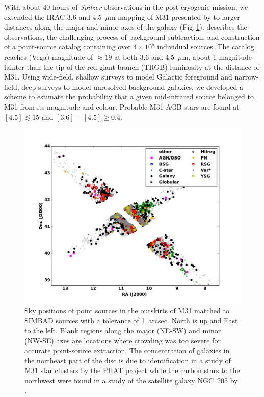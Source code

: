 \documentclass{iau}
\begin{document}
With about 40 hours of {\it Spitzer} observations in the post-cryogenic mission, we extended the IRAC 3.6 and 4.5~$\mu$m
mapping of M31 presented by \cite[Barmby \etal\ (2006)]{barmby06} to larger distances along the major and minor
axes of the galaxy (Fig.\,\ref{fig1}). \cite[Rafiei Ravandi \etal\ (2016)]{rr16} describes the observations, the challenging process of background
subtraction, and construction of a point-source catalog containing over $4\times 10^5$ individual sources. The catalog reaches (Vega)
magnitude of $\approx 19$ at both 3.6 and 4.5~$\mu$m, about 1 magnitude fainter than the tip of the red giant branch (TRGB) luminosity
at the distance of M31. Using wide-field, shallow surveys to model Galactic foreground and narrow-field, deep surveys to model 
unresolved background galaxies, we developed a scheme to estimate the probability that 
a given mid-infrared source belonged to M31 from its magnitude and colour. Probable M31 AGB stars
are found  at $[4.5]\lesssim15$ and $[3.6]-[4.5] \geq 0.4$. 


\begin{figure}[t]
\begin{center}
 \includegraphics[width=5in]{barmby_iaus321_fig1} 
 \caption{Sky positions of point sources in the outskirts of M31 matched to SIMBAD sources with a tolerance of 1~arcsec. North is up and East to the left.
 Blank regions along the major (NE-SW) and minor (NW-SE) axes are locations where crowding was too severe for accurate point-source extraction.
The concentration of galaxies in the northeast part of the disc is due to identification in a study of M31 star clusters by the PHAT project 
\cite[(Johnson \etal\ 2012)]{johnson12} 
while the carbon stars to the northwest were found in a study of the satellite galaxy NGC~205 by \cite[Demers, Battinelli \& Letarte (2003)]{dbl03}.}
   \label{fig1}
\end{center}
\end{figure}
\end{document}
